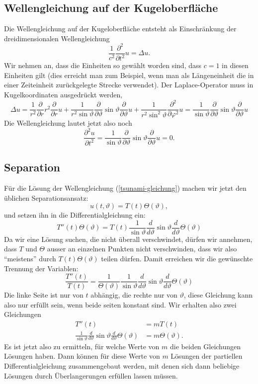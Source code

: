 \subsection{Wellengleichung auf der Kugeloberfläche}
Die Wellengleichung auf der Kugeloberfläche entsteht als 
Einschränkung der dreidimensionalen Wellengleichung
\[
\frac1{c^2} \frac{\partial^2}{\partial t^2}u =\Delta u.
\]
Wir nehmen an, dass die Einheiten so gewählt worden sind,
dass $c=1$ in diesen Einheiten gilt (dies erreicht man zum
Beispiel, wenn man als Längeneinheit die in einer Zeiteinheit
zurückgelegte Strecke verwendet).
Der Laplace-Operator muss in Kugelkoordinaten ausgedrückt werden,
\[
\Delta u
=
\frac1{r^2} \frac{\partial}{\partial r}r^2\frac{\partial}{\partial r}u
+
\frac1{r^2\sin\vartheta}
\frac{\partial}{\partial\vartheta}
\sin\vartheta
\frac{\partial}{\partial\vartheta}
u
+
\frac1{r^2\sin^2\vartheta}\frac{\partial^2}{\partial\varphi^2}u
=
\frac1{\sin\vartheta}
\frac{\partial}{\partial\vartheta}
\sin\vartheta
\frac{\partial}{\partial\vartheta}
u
\]
Die Wellengleichung lautet jetzt also noch
\begin{equation}
\frac{\partial^2u}{\partial t^2}=
\frac1{\sin\vartheta}
\frac{\partial}{\partial\vartheta}
\sin\vartheta
\frac{\partial}{\partial\vartheta}
u=0.
\label{tsunami-gleichung}
\end{equation}

\subsection{Separation}
Für die Lösung der Wellengleichung (\ref{tsunami-gleichung}) machen
wir jetzt den üblichen Separationsansatz:
\[
u(t,\vartheta)=T(t)\Theta(\vartheta),
\]
und setzen ihn in die Differentialgleichung ein:
\[
T''(t)\Theta(\vartheta)=
T(t)
\frac1{\sin\vartheta}
\frac{d}{d\vartheta}
\sin\vartheta
\frac{d}{d\vartheta}\Theta(\vartheta)
\]
Da wir eine Lösung suchen, die nicht überall verschwindet,
dürfen wir annehmen, dass $T$ und $\Theta$ ausser an einzelnen
Punkten nicht verschwinden, dass wir also ``meistens'' durch
$T(t)\Theta(\vartheta)$ teilen dürfen. Damit erreichen wir
die gewünschte Trennung der Variablen:
\begin{equation}
\frac{T''(t)}{T(t)}
=
\frac1{\Theta(\vartheta)}
\frac1{\sin\vartheta}
\frac{d}{d\vartheta}
\sin\vartheta
\frac{d}{d\vartheta}\Theta(\vartheta)
\label{tsunami-separiert}
\end{equation}
Die linke Seite ist nur von $t$ abhängig, die rechte nur von $\vartheta$,
diese Gleichung kann also nur erfüllt sein, wenn beide seiten konstant
sind.  Wir erhalten also zwei Gleichungen
\begin{align}
T''(t)&=mT(t)
\label{tsunami:zeitabh}
\\
\frac1{\sin\vartheta}
\frac{d}{d\vartheta}
\sin\vartheta
\frac{d}{d\vartheta}\Theta(\vartheta)
&=m\Theta(\vartheta).
\label{tsunami:winkelabh}
\end{align}
Es ist jetzt also zu ermitteln, für welche Werte von $m$ die beiden
Gleichungen Lösungen haben. Dann können für diese Werte von $m$ 
Lösungen der partiellen Differentialgleichung zusammengebaut werden,
mit denen sich dann beliebige Lösungen durch Überlangerungen
erfüllen lassen müssen.

